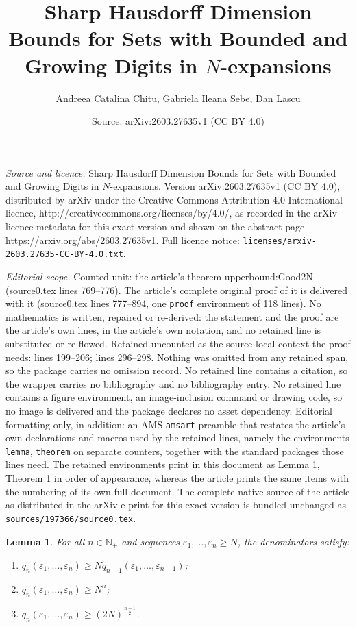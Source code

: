 \documentclass[10pt,a4paper]{amsart}
\title{Sharp Hausdorff Dimension Bounds for Sets with Bounded and Growing Digits in $N$-expansions}
\author{Andreea Catalina Chitu, Gabriela Ileana Sebe, Dan Lascu}
\date{Source: arXiv:2603.27635v1 (CC BY 4.0)}
\newtheorem{lemma}{Lemma}
\newcommand{\N}{\mathbb{N}}
\begin{document}
\maketitle

\noindent\emph{Source and licence.} Sharp Hausdorff Dimension Bounds for Sets with Bounded and Growing Digits in $N$-expansions. Version arXiv:2603.27635v1 (CC BY 4.0), distributed by arXiv under the Creative Commons Attribution 4.0 International licence, http://creativecommons.org/licenses/by/4.0/, as recorded in the arXiv licence metadata for this exact version and shown on the abstract page https://arxiv.org/abs/2603.27635v1. Full licence notice: \texttt{licenses/arxiv-2603.27635-CC-BY-4.0.txt}.\par\smallskip

\noindent\textit{Editorial scope.} Counted unit: the article's theorem upperbound:Good2N (source0.tex lines 769--776). The article's complete original proof of it is delivered with it (source0.tex lines 777--894, one \texttt{proof} environment of 118 lines). No mathematics is written, repaired or re-derived: the statement and the proof are the article's own lines, in the article's own notation, and no retained line is substituted or re-flowed.  Retained uncounted as the source-local context the proof needs: lines 199--206; lines 296--298.  Nothing was omitted from any retained span, so the package carries no omission record.  No retained line contains a citation, so the wrapper carries no bibliography and no bibliography entry.  No retained line contains a figure environment, an image-inclusion command or drawing code, so no image is delivered and the package declares no asset dependency.  Editorial formatting only, in addition: an AMS \texttt{amsart} preamble that restates the article's own declarations and macros used by the retained lines, namely the environments \texttt{lemma}, \texttt{theorem} on separate counters, together with the standard packages those lines need.  The retained environments print in this document as Lemma 1, Theorem 1 in order of appearance, whereas the article prints the same items with the numbering of its own full document.  The complete native source of the article as distributed in the arXiv e-print for this exact version is bundled unchanged as \texttt{sources/197366/source0.tex}.
\begin{lemma} \label{lemma:q-growth}
For all $n \in \N_+$ and sequences $\varepsilon_1, \ldots, \varepsilon_n \geq N$, the denominators satisfy:
\begin{enumerate}
\item[(i)] ${q_{n}(\varepsilon_1, \ldots, \varepsilon_n)} \ge N {q_{n-1}(\varepsilon_1, \ldots, \varepsilon_{n-1})}$;
\item[(ii)] $q_n(\varepsilon_1, \ldots, \varepsilon_n) \geq N^n$;
\item[(iii)] $q_n(\varepsilon_1, \ldots, \varepsilon_n) \geq (2N)^{\frac{n-1}{2}}$.
\end{enumerate}
\end{lemma}
\end{document}
